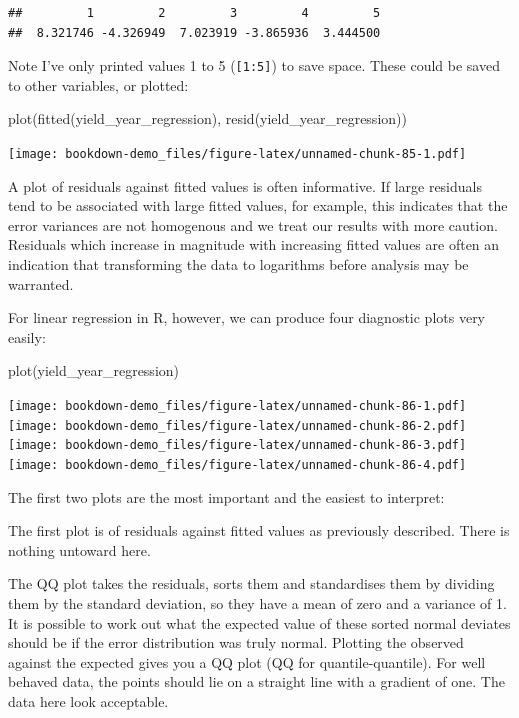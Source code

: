 \documentclass[
]{book}
\newenvironment{Shaded}{\begin{snugshade}}{\end{snugshade}}
\newcommand{\FunctionTok}[1]{\textcolor[rgb]{0.00,0.00,0.00}{#1}}
\newcommand{\NormalTok}[1]{#1}
\begin{document}
\begin{verbatim}
##         1         2         3         4         5 
##  8.321746 -4.326949  7.023919 -3.865936  3.444500
\end{verbatim}

Note I've only printed values 1 to 5 (\texttt{{[}1:5{]}}) to save space. These could be saved to other variables, or plotted:

\begin{Shaded}
\begin{Highlighting}[]
\FunctionTok{plot}\NormalTok{(}\FunctionTok{fitted}\NormalTok{(yield\_year\_regression), }\FunctionTok{resid}\NormalTok{(yield\_year\_regression))}
\end{Highlighting}
\end{Shaded}

\texttt{[image: bookdown-demo\_files/figure-latex/unnamed-chunk-85-1.pdf]}

A plot of residuals against fitted values is often informative. If large residuals tend to be associated with large fitted values, for example, this indicates that the error variances are not homogenous and we treat our results with more caution. Residuals which increase in magnitude with increasing fitted values are often an indication that transforming the data to logarithms before analysis may be warranted.

For linear regression in R, however, we can produce four diagnostic plots very easily:

\begin{Shaded}
\begin{Highlighting}[]
\FunctionTok{plot}\NormalTok{(yield\_year\_regression)}
\end{Highlighting}
\end{Shaded}

\texttt{[image: bookdown-demo\_files/figure-latex/unnamed-chunk-86-1.pdf]} \texttt{[image: bookdown-demo\_files/figure-latex/unnamed-chunk-86-2.pdf]} \texttt{[image: bookdown-demo\_files/figure-latex/unnamed-chunk-86-3.pdf]} \texttt{[image: bookdown-demo\_files/figure-latex/unnamed-chunk-86-4.pdf]}

The first two plots are the most important and the easiest to interpret:

The first plot is of residuals against fitted values as previously described. There is nothing untoward here.

The QQ plot takes the residuals, sorts them and standardises them by dividing them by the standard deviation, so they have a mean of zero and a variance of 1. It is possible to work out what the expected value of these sorted normal deviates should be if the error distribution was truly normal. Plotting the observed against the expected gives you a QQ plot (QQ for quantile-quantile). For well behaved data, the points should lie on a straight line with a gradient of one. The data here look acceptable.
\end{document}
